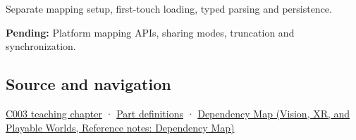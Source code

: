Separate mapping setup, first-touch loading, typed parsing and persistence.

\textbf{Pending:} Platform mapping APIs, sharing modes, truncation and synchronization.

\subsection{Source and navigation}\label{appendix-313ee7a0ba7b-source-and-navigation}

\hyperref[01-foundations-i-ch002-where-the-bytes-live]{C003 teaching chapter} · \hyperref[appendix-fd090d982a15-m003---parts-41-60]{Part definitions} · \href{../07-Vision-XR-and-Playable-Worlds/main.pdf\#nameddest=appendix-4ad47bdd269a}{Dependency Map (Vision, XR, and Playable Worlds, Reference notes: Dependency Map)}
